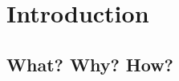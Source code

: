 \documentclass[runningheads,a4paper,11pt]{report}
\begin{document}
\newpage

\listoftables
\listoffigures

\newpage




\newpage



 


\chapter{Introduction}
\label{chapter:introduction}

\section{What? Why? How?}
\label{section:what}
\end{document}
